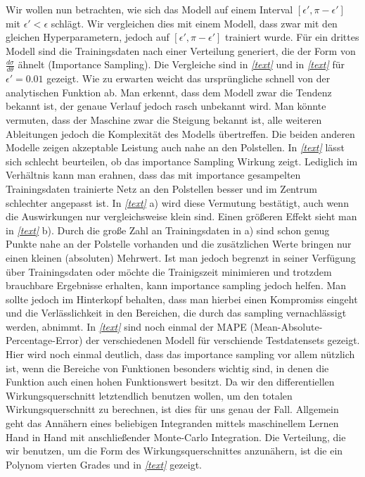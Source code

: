 Wir wollen nun betrachten, wie sich das Modell auf einem Interval $[\epsilon', \pi-\epsilon']$ mit $\epsilon' < \epsilon$ schlägt. Wir vergleichen dies mit einem Modell, dass zwar mit den gleichen Hyperparametern, jedoch auf $[\epsilon', \pi-\epsilon']$ trainiert wurde. Für ein drittes Modell sind die Trainingsdaten nach einer Verteilung generiert, die der Form von $\frac{d\sigma}{d\theta}$ ähnelt (Importance Sampling). Die Vergleiche sind in \textit{\autoref{text}} und in \textit{\autoref{text}} für $\epsilon' = 0.01$ gezeigt. Wie zu erwarten weicht das ursprüngliche schnell von der analytischen Funktion ab. Man erkennt, dass dem Modell zwar die Tendenz bekannt ist, der genaue Verlauf jedoch rasch unbekannt wird. Man könnte vermuten, dass der Maschine zwar die Steigung bekannt ist, alle weiteren Ableitungen jedoch die Komplexität des Modells übertreffen. Die beiden anderen Modelle zeigen akzeptable Leistung auch nahe an den Polstellen. In \textit{\autoref{text}} lässt sich schlecht beurteilen, ob das importance Sampling Wirkung zeigt. Lediglich im Verhältnis kann man erahnen, dass das mit importance gesampelten Trainingsdaten trainierte Netz an den Polstellen besser und im Zentrum schlechter angepasst ist. In \textit{\autoref{text}} a) wird diese Vermutung bestätigt, auch wenn die Auswirkungen nur vergleichsweise klein sind. Einen größeren Effekt sieht man in \textit{\autoref{text}} b). Durch die große Zahl an Trainingsdaten in a) sind schon genug Punkte nahe an der Polstelle vorhanden und die zusätzlichen Werte bringen nur einen kleinen (absoluten) Mehrwert. Ist man jedoch begrenzt in seiner Verfügung über Trainingsdaten oder möchte die Trainigszeit minimieren und trotzdem brauchbare Ergebnisse erhalten, kann importance sampling jedoch helfen. Man sollte jedoch im Hinterkopf behalten, dass man hierbei einen Kompromiss eingeht und die Verlässlichkeit in den Bereichen, die durch das sampling vernachlässigt werden, abnimmt. 
In \textit{\autoref{text}} sind noch einmal der MAPE (Mean-Absolute-Percentage-Error) der verschiedenen Modell für verschiende Testdatensets gezeigt. Hier wird noch einmal deutlich, dass das importance sampling vor allem nützlich ist, wenn die Bereiche von Funktionen besonders wichtig sind, in denen die Funktion auch einen hohen Funktionswert besitzt. Da wir den differentiellen Wirkungsquerschnitt letztendlich benutzen wollen, um den totalen Wirkungsquerschnitt zu berechnen, ist dies für uns genau der Fall. Allgemein geht das Annähern eines beliebigen Integranden mittels maschinellem Lernen Hand in Hand mit anschließender Monte-Carlo Integration. Die Verteilung, die wir benutzen, um die Form des Wirkungsquerschnittes anzunähern, ist die ein Polynom vierten Grades und in \textit{\autoref{text}} gezeigt.
